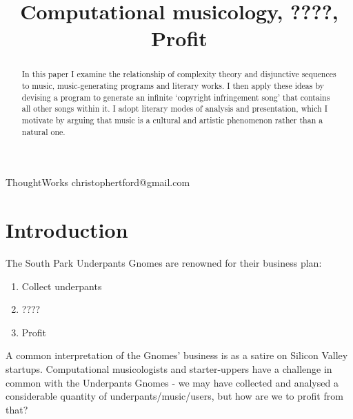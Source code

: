 \documentclass[numbers]{sigplanconf}
\begin{document}
\setlength{\pdfpageheight}{\paperheight}
\setlength{\pdfpagewidth}{\paperwidth}




\title{Computational musicology, ????, Profit}

           {ThoughtWorks}
           {christophertford@gmail.com}

\maketitle

\begin{abstract}
In this paper I examine the relationship of complexity theory and disjunctive sequences to music, music-generating programs and
literary works. I then apply these ideas by devising a program to generate an infinite `copyright infringement song' that contains
all other songs within it. I adopt literary modes of analysis and presentation, which I motivate by
arguing that music is a cultural and artistic phenomenon rather than a natural one.
\end{abstract}



\section{Introduction}

The South Park Underpants Gnomes\cite{Gnomes} are renowned for their business plan:
\begin{enumerate}
    \item Collect underpants
    \item ????
    \item Profit
\end{enumerate}

A common interpretation of the Gnomes' business is as a satire on Silicon Valley startups.
Computational musicologists and starter-uppers have a challenge in common with the Underpants Gnomes
- we may have collected and analysed a considerable quantity of underpants/music/users, but how are we to profit from that?
\end{document}
